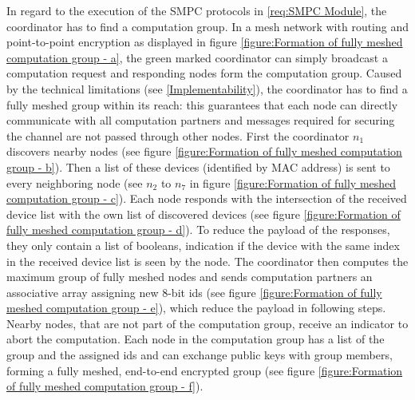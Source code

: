 In regard to the execution of the \gls{SMPC} protocols in \ref{req:SMPC Module}, the coordinator has to find a computation group. In a mesh network with routing and point-to-point encryption as displayed in figure \ref{figure:Formation of fully meshed computation group - a}, the green marked coordinator can simply broadcast a computation request and responding nodes form the computation group. Caused by the technical limitations (see \ref{Implementability}), the coordinator has to find a fully meshed group within its reach: this guarantees that each node can directly communicate with all computation partners and messages required for securing the channel are not passed through other nodes. First the coordinator $n_1$ discovers nearby nodes (see figure \ref{figure:Formation of fully meshed computation group - b}). Then a list of these devices (identified by \gls{MAC} address) is sent to every neighboring node (see $n_2$ to $n_7$ in figure \ref{figure:Formation of fully meshed computation group - c}). Each node responds with the intersection of the received device list with the own list of discovered devices (see figure \ref{figure:Formation of fully meshed computation group - d}). To reduce the payload of the responses, they only contain a list of booleans, indication if the device with the same index in the received device list is seen by the node. The coordinator then computes the maximum group of fully meshed nodes and sends computation partners an associative array assigning new 8-bit ids (see figure \ref{figure:Formation of fully meshed computation group - e}), which reduce the payload in following steps. Nearby nodes, that are not part of the computation group, receive an indicator to abort the computation. Each node in the computation group has a list of the group and the assigned ids and can exchange public keys with group members, forming a fully meshed, end-to-end encrypted group (see figure \ref{figure:Formation of fully meshed computation group - f}).

